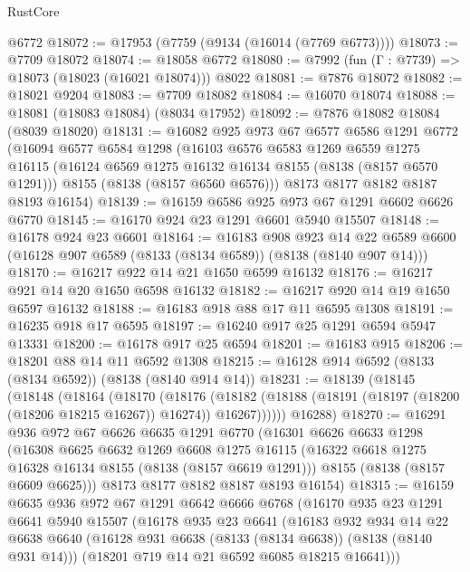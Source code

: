 \begin{lexlean}{RustCore}
\begin{coremodule}
    @6772
@18072 := @17953 (@7759 (@9134 (@16014 (@7769 @6773))))
@18073 := @7709 @18072
@18074 := @18058 @6772
@18080 := @7992 (fun (Γ : @7739) => @18073 (@18023 (@16021 @18074))) @8022
@18081 := @7876 @18072
@18082 := @18021 @9204
@18083 := @7709 @18082
@18084 := @16070 @18074
@18088 := @18081 (@18083 @18084) (@8034 @17952)
@18092 := @7876 @18082 @18084 (@8039 @18020)
@18131 := @16082
    @925
    @973
    @67
    @6577
    @6586
    @1291
    @6772
    (@16094
      @6577
      @6584
      @1298
      (@16103
        @6576
        @6583
        @1269
        @6559
        @1275
        @16115
        (@16124 @6569 @1275 @16132 @16134 @8155 (@8138 (@8157 @6570 @1291)))
        @8155
        (@8138 (@8157 @6560 @6576)))
      @8173
      @8177
      @8182
      @8187
      @8193
      @16154)
@18139 := @16159 @6586 @925 @973 @67 @1291 @6602 @6626 @6770
@18145 := @16170 @924 @23 @1291 @6601 @5940 @15507
@18148 := @16178 @924 @23 @6601
@18164 := @16183
    @908
    @923
    @14
    @22
    @6589
    @6600
    (@16128 @907 @6589 (@8133 (@8134 @6589)) (@8138 (@8140 @907 @14)))
@18170 := @16217 @922 @14 @21 @1650 @6599 @16132
@18176 := @16217 @921 @14 @20 @1650 @6598 @16132
@18182 := @16217 @920 @14 @19 @1650 @6597 @16132
@18188 := @16183 @918 @88 @17 @11 @6595 @1308
@18191 := @16235 @918 @17 @6595
@18197 := @16240 @917 @25 @1291 @6594 @5947 @13331
@18200 := @16178 @917 @25 @6594
@18201 := @16183 @915
@18206 := @18201 @88 @14 @11 @6592 @1308
@18215 := @16128 @914 @6592 (@8133 (@8134 @6592)) (@8138 (@8140 @914 @14))
@18231 := @18139
    (@18145
      (@18148
        (@18164
          (@18170
            (@18176
              (@18182 (@18188 (@18191 (@18197 (@18200 (@18206 @18215 @16267)) @16274)) @16267))))))
      @16288)
@18270 := @16291
    @936
    @972
    @67
    @6626
    @6635
    @1291
    @6770
    (@16301
      @6626
      @6633
      @1298
      (@16308
        @6625
        @6632
        @1269
        @6608
        @1275
        @16115
        (@16322 @6618 @1275 @16328 @16134 @8155 (@8138 (@8157 @6619 @1291)))
        @8155
        (@8138 (@8157 @6609 @6625)))
      @8173
      @8177
      @8182
      @8187
      @8193
      @16154)
@18315 := @16159
    @6635
    @936
    @972
    @67
    @1291
    @6642
    @6666
    @6768
    (@16170
      @935
      @23
      @1291
      @6641
      @5940
      @15507
      (@16178
        @935
        @23
        @6641
        (@16183
          @932
          @934
          @14
          @22
          @6638
          @6640
          (@16128 @931 @6638 (@8133 (@8134 @6638)) (@8138 (@8140 @931 @14)))
          (@18201 @719 @14 @21 @6592 @6085 @18215 @16641)))

\end{coremodule}
\end{lexlean}
